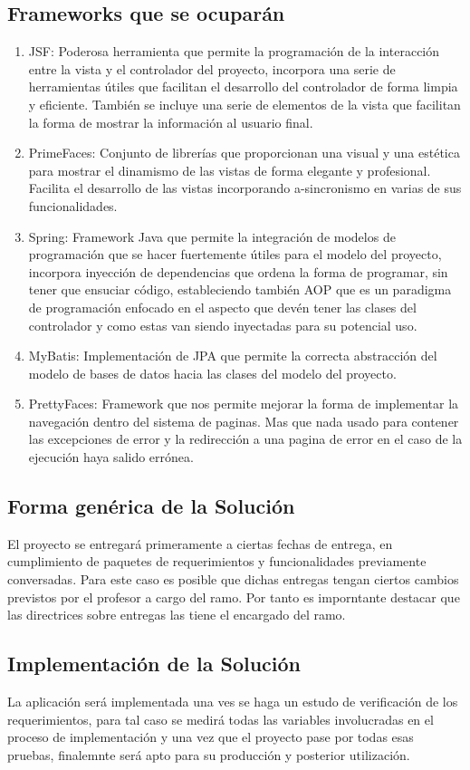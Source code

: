 \documentclass[a4paper,12pt,openany,oneside]{book}
\begin{document}
\subsection{Frameworks que se ocuparán}
\begin{enumerate}
\item JSF: Poderosa herramienta que permite la programación de la interacción entre la vista y el controlador del proyecto, incorpora una serie de herramientas útiles que facilitan el desarrollo del controlador de forma limpia y eficiente. También se incluye una serie de elementos de la vista que facilitan la forma de mostrar la información al usuario final.
\item PrimeFaces: Conjunto de librerías que proporcionan una visual y una estética para mostrar el dinamismo de las vistas de forma elegante y profesional. Facilita el desarrollo de las vistas incorporando a-sincronismo en varias de sus funcionalidades. 
\item Spring: Framework Java que permite la integración de modelos de programación que se hacer fuertemente útiles para el modelo del proyecto, incorpora inyección de dependencias que ordena la forma de programar, sin tener que ensuciar código, estableciendo también AOP que es un paradigma de programación enfocado en el aspecto que devén tener las clases del controlador y como estas van siendo inyectadas para su potencial uso. 
\item MyBatis: Implementación de JPA que permite la correcta abstracción del modelo de bases de datos hacia las clases del modelo del proyecto.
\item PrettyFaces: Framework que nos permite mejorar la forma de implementar la navegación dentro del sistema de paginas. Mas que nada usado para contener las excepciones de error y la redirección a una pagina de error en el caso de la ejecución haya salido errónea.
\end{enumerate}
\subsection{Forma genérica de la Solución}
El proyecto se entregará primeramente a ciertas fechas de entrega, en cumplimiento de paquetes de requerimientos y funcionalidades previamente conversadas. Para este caso es posible que dichas entregas tengan ciertos cambios previstos por el profesor a cargo del ramo. Por tanto es imporntante destacar que las directrices sobre entregas las tiene el encargado del ramo.
\subsection{Implementación de la Solución}
La aplicación será implementada una ves se haga un estudo de verificación de los requerimientos, para tal caso se medirá todas las variables involucradas en el proceso de implementación y una vez que el proyecto pase por todas esas pruebas, finalemnte será apto para su producción y posterior utilización.
\end{document}
